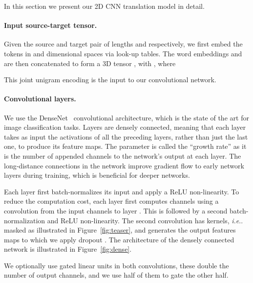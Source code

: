 \documentclass[11pt,a4paper]{article}
\makeatletter
\DeclareRobustCommand\onedot{\futurelet\@let@token\@onedot}
\def\@onedot{\ifx\@let@token.\else.\null\fi\xspace}
\def\ie{\emph{i.e}\onedot} \def\Ie{\emph{I.e}\onedot}
\def\fig#1{Figure~\ref{fig:#1}}
\makeatother
\begin{document}
In this section we present our 2D CNN translation model in detail.

\paragraph{Input source-target tensor.}
Given the source and target pair  of lengths  and  respectively, we first embed the tokens in  and  dimensional spaces via look-up tables. 
The word embeddings  and  are then concatenated to form a 3D tensor , with , where

This joint unigram encoding is the input to our convolutional network. 


\paragraph{Convolutional layers.}



We use the DenseNet~\cite{huang17cvpr} convolutional architecture, which is the state of the art for image classification tasks.
Layers are densely connected, meaning that each layer takes as input the  activations of all the preceding layers, rather than just the last one, to produce its  feature maps. The parameter  is called the ``growth rate'' as it is the number of appended channels to the network's output at each layer.
The long-distance connections in the network improve gradient flow to early network layers during training, which is beneficial for deeper networks.

Each layer first batch-normalizes \cite{ioffe15icml} its input and apply a ReLU \cite{nair10icml} non-linearity. 
To reduce the computation cost, each layer first computes  channels using a  convolution from the  input channels to layer . This is followed by a second batch-normalization and ReLU non-linearity. 
The second convolution has  kernels, \ie masked as illustrated in \fig{teaser}, and generates the  output features maps to which we apply dropout \cite{srivastava14jmlr}.
The architecture of the densely connected network is illustrated in \fig{dense}.

We optionally use gated linear units \citep{dauphin17icml} in both convolutions, these double the number of output channels, and we use half of them to gate the other half.
\end{document}
